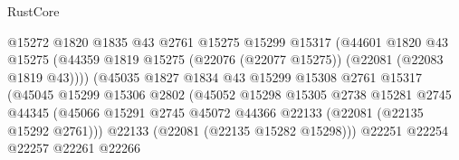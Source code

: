 \begin{lexlean}{RustCore}
\begin{coremodule}
                                        @15272
                                        @1820
                                        @1835
                                        @43
                                        @2761
                                        @15275
                                        @15299
                                        @15317
                                        (@44601
                                          @1820
                                          @43
                                          @15275
                                          (@44359
                                            @1819
                                            @15275
                                            (@22076 (@22077 @15275))
                                            (@22081 (@22083 @1819 @43))))
                                        (@45035
                                          @1827
                                          @1834
                                          @43
                                          @15299
                                          @15308
                                          @2761
                                          @15317
                                          (@45045
                                            @15299
                                            @15306
                                            @2802
                                            (@45052
                                              @15298
                                              @15305
                                              @2738
                                              @15281
                                              @2745
                                              @44345
                                              (@45066
                                                @15291
                                                @2745
                                                @45072
                                                @44366
                                                @22133
                                                (@22081 (@22135 @15292 @2761)))
                                              @22133
                                              (@22081 (@22135 @15282 @15298)))
                                            @22251
                                            @22254
                                            @22257
                                            @22261
                                            @22266

\end{coremodule}
\end{lexlean}
